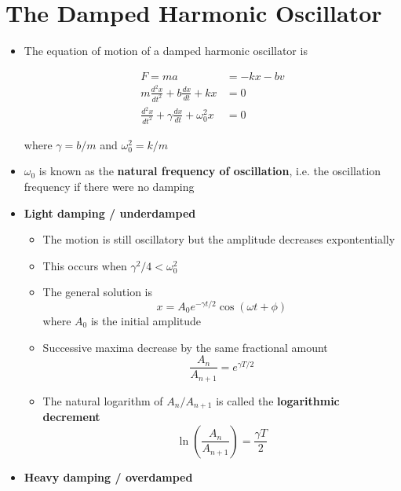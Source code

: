 \documentclass{article}
\begin{document}
\section{The Damped Harmonic Oscillator}

\begin{itemize}
  \item The equation of motion of a damped harmonic oscillator is

        \begin{align*}
          F = m a                                                     & = -k x - b v \\
          m \frac{d^2 x}{d t^2} + b \frac{d x}{d t} + k x             & = 0          \\
          \frac{d^2 x}{d t^2} + \gamma \frac{d x}{d t} + \omega_0^2 x & = 0
        \end{align*}

        where $\gamma = b / m$ and $\omega_0^2 = k / m$

  \item $\omega_0$ is known as the \textbf{natural frequency of oscillation}, i.e. the oscillation frequency if there were no damping

  \item \textbf{Light damping / underdamped}

        \begin{itemize}
          \item The motion is still oscillatory but the amplitude decreases expontentially

          \item This occurs when $\gamma^2 / 4 < \omega_0^2$

          \item The general solution is \[x = A_0 e^{-\gamma t / 2} \cos (\omega t + \phi)\] where $A_0$ is the initial amplitude

          \item Successive maxima decrease by the same fractional amount \[\frac{A_n}{A_{n + 1}} = e^{\gamma T / 2}\]

          \item The natural logarithm of $A_n / A_{n + 1}$ is called the \textbf{logarithmic decrement} \[\ln \left( \frac{A_n}{A_{n + 1}} \right) = \frac{\gamma T}{2}\]
        \end{itemize}

  \item \textbf{Heavy damping / overdamped}


\end{itemize}
\end{document}
